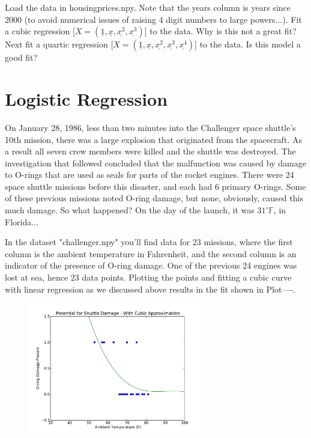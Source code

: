 \begin{problem}
Load the data in housingprices.npy. Note that the years column is years since 2000 (to avoid numerical issues of raising 4 digit numbers to large powers...). Fit a cubic regression [$X=(\underline{1},\underline{x},\underline{x^2},\underline{x^3})$] to the data. Why is this not a great fit? Next fit a quartic regression [$X=(\underline{1},\underline{x},\underline{x^2},\underline{x^3},\underline{x^4})$] to the data. Is this model a good fit?
\end{problem}


\section*{Logistic Regression}
On January 28, 1986, less than two minutes into the Challenger space shuttle's 10th mission, there was a large explosion that originated from the spacecraft. As a result all seven crew members were killed and the shuttle was destroyed. The investigation that followed concluded that the malfunction was caused by damage to O-rings that are used as seals for parts of the rocket engines. There were 24 space shuttle missions before this disaster, and each had 6 primary O-rings. Some of these previous missions noted O-ring damage, but none, obviously, caused this much damage. So what happened? On  the day of the launch, it was $31^{\circ}  \mathbb{F}$, in Florida...

In the dataset "challenger.npy" you'll find data for 23 missions, where the first column is the ambient temperature in Fahrenheit, and the second column is an indicator of the presence of O-ring damage. One of the previous 24 engines was lost at sea, hence 23 data points.  Plotting the points and fitting a cubic curve with linear regression as we discussed above results in the fit shown in Plot----. 

\begin{figure}[h]
\label{badfit}
\centering
\includegraphics[width=3in]{cubicthrulogitpoints.pdf}
\end{figure}

